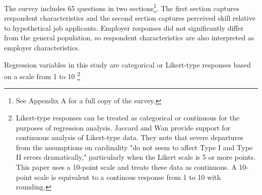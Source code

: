 \documentclass[review]{elsarticle}
\begin{document}
The survey includes 65 questions in two sections\footnote{See Appendix A for a full copy of the survey.}.
The first section captures respondent characteristics and the second section captures perceived skill relative to hypothetical job applicants.
Employer responses did not significantly differ from the general population,
so respondent characteristics are also interpreted as employer characteristics.

Regression variables in this study are categorical or Likert-type responses based on a scale from 1 to 10
\footnote{
    Likert-type responses can be treated as categorical or continuous for the purposes of regression analysis.
    Jaccard and Wan provide support for continuous analysis of Likert-type data.
    They note that severe departures from the assumptions on cardinality "do not seem to affect Type I and Type II errors dramatically,"
    particularly when the Likert scale is 5 or more points\cite{jaccard1996lisrel}.
    This paper uses a 10-point scale and treats these data as continuous.
    A 10-point scale is equivalent to a continous response from 1 to 10 with rounding.
}
\end{document}

